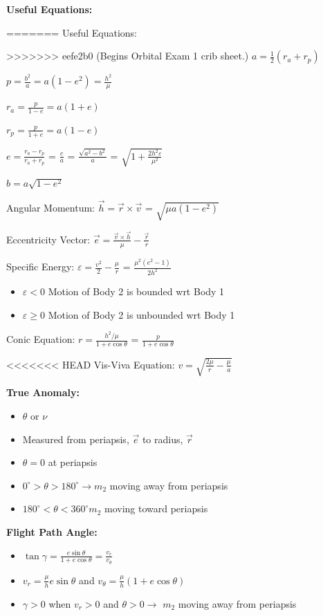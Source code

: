 \documentclass{article}
\begin{document}
\begin{multicols*}{3}
    \textbf{Useful Equations:}\par
=======
    Useful Equations:\par
>>>>>>> eefe2b0 (Begins Orbital Exam 1 crib sheet.)
    $a = \frac{1}{2}(r_a+r_p)$\par 
    $p=\frac{b^2}{a}=a(1-e^2)=\frac{h^2}{\mu}$\par 
    $r_a = \frac{p}{1-e}=a(1+e)$\par 
    $r_p = \frac{p}{1+e}=a(1-e)$\par
    $e = \frac{r_a-r_p}{r_a+r_p}$ = $\frac{c}{a}$ = $\frac{\sqrt{a^2-b^2}}{a}$ = $\sqrt{1+\frac{2h^2\varepsilon}{\mu^2}}$\par 
    $b = a\sqrt{1-e^2}$ \par
    Angular Momentum: $\vec{h} = \vec{r} \times \vec{v}$ = $\sqrt{\mu a (1-e^2)}$ \par
    Eccentricity Vector: $\vec{e} = \frac{\vec{v} \times \vec{h}}{\mu}-\frac{\vec{r}}{r}$\par
    Specific Energy: $\varepsilon = \frac{v^2}{2}-\frac{\mu}{r}$ = $\frac{\mu^2(e^2-1)}{2h^2}$\par
    \begin{itemize}
        \itemsep0em
        \item $\varepsilon < 0$ Motion of Body 2 is bounded wrt Body 1
        \item $\varepsilon \ge 0$ Motion of Body 2 is unbounded wrt Body 1
    \end{itemize}
    Conic Equation: $r = \frac{h^2/\mu}{1+e\cos{\theta}}$ = $\frac{p}{1+e\cos{\theta}}$\par 
<<<<<<< HEAD
    Vis-Viva Equation: $v=\sqrt{\frac{2\mu}{r}-\frac{\mu}{a}}$\par
    \textbf{True Anomaly:} 
    \begin{itemize}
        \itemsep0em
        \item $\theta$ or $\nu$
        \item Measured from periapsis, $\vec{e}$ to radius, $\vec{r}$
        \item $\theta = 0$ at periapsis
        \item $0^\circ > \theta > 180^\circ \rightarrow m_2$ moving away from periapsis
        \item $180^\circ < \theta < 360^\circ m_2$ moving toward periapsis
    \end{itemize}
    \textbf{Flight Path Angle:} 
    \begin{itemize}
        \itemsep0em
        \item $\tan{\gamma} = \frac{e\sin{\theta}}{1+e\cos{\theta}} = \frac{v_r}{v_{\theta}}$
        \item $v_r = \frac{\mu}{h}e\sin{\theta}$ and $v_\theta = \frac{\mu}{h}(1+e\cos{\theta})$
        \item $\gamma > 0$ when $v_r>0$ and $\theta>0\rightarrow$ $m_2$ moving away from periapsis
    \end{itemize}
     

\end{multicols*}
\end{document}
